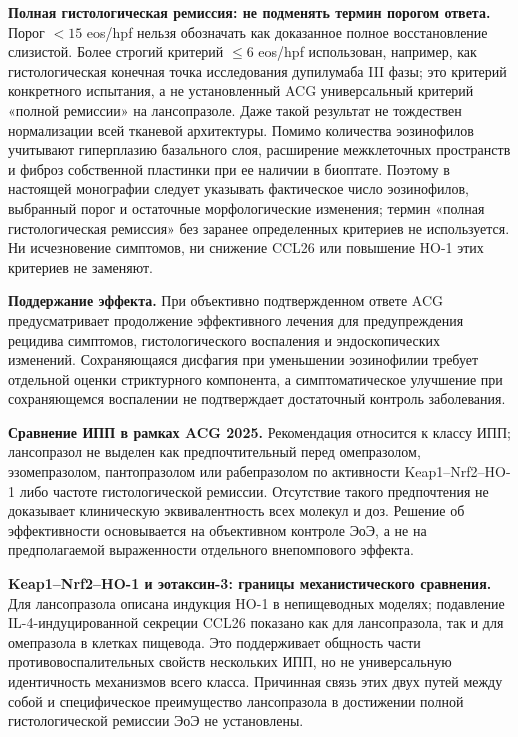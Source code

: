 \documentclass[11pt,a4paper,notitlepage]{report}
\newcommand{\src}[1]{\unskip\space\cite{#1}}
\begin{document}
\textbf{Полная гистологическая ремиссия: не подменять термин порогом ответа.} Порог $<15$ eos/hpf нельзя обозначать как доказанное полное восстановление слизистой. Более строгий критерий $\leq6$ eos/hpf использован, например, как гистологическая конечная точка исследования дупилумаба III фазы; это критерий конкретного испытания, а не установленный ACG универсальный критерий «полной ремиссии» на лансопразоле. Даже такой результат не тождествен нормализации всей тканевой архитектуры. Помимо количества эозинофилов учитывают гиперплазию базального слоя, расширение межклеточных пространств и фиброз собственной пластинки при ее наличии в биоптате. Поэтому в настоящей монографии следует указывать фактическое число эозинофилов, выбранный порог и остаточные морфологические изменения; термин «полная гистологическая ремиссия» без заранее определенных критериев не используется. Ни исчезновение симптомов, ни снижение CCL26 или повышение HO-1 этих критериев не заменяют.\src{eoeguide,eoedupilumab2022}

\textbf{Поддержание эффекта.} При объективно подтвержденном ответе ACG предусматривает продолжение эффективного лечения для предупреждения рецидива симптомов, гистологического воспаления и эндоскопических изменений. Сохраняющаяся дисфагия при уменьшении эозинофилии требует отдельной оценки стриктурного компонента, а симптоматическое улучшение при сохраняющемся воспалении не подтверждает достаточный контроль заболевания.\src{eoe,eoehighlights2025}

\textbf{Сравнение ИПП в рамках ACG 2025.} Рекомендация относится к классу ИПП; лансопразол не выделен как предпочтительный перед омепразолом, эзомепразолом, пантопразолом или рабепразолом по активности Keap1--Nrf2--HO-1 либо частоте гистологической ремиссии. Отсутствие такого предпочтения не доказывает клиническую эквивалентность всех молекул и доз. Решение об эффективности основывается на объективном контроле ЭоЭ, а не на предполагаемой выраженности отдельного внепомпового эффекта.\src{eoe,eoeguide}

\textbf{Keap1--Nrf2--HO-1 и эотаксин-3: границы механистического сравнения.} Для лансопразола описана индукция HO-1 в непищеводных моделях; подавление IL-4-индуцированной секреции CCL26 показано как для лансопразола, так и для омепразола в клетках пищевода. Это поддерживает общность части противовоспалительных свойств нескольких ИПП, но не универсальную идентичность механизмов всего класса. Причинная связь этих двух путей между собой и специфическое преимущество лансопразола в достижении полной гистологической ремиссии ЭоЭ не установлены.\src{molnrf2,molho1,eoestat6}
\end{document}
